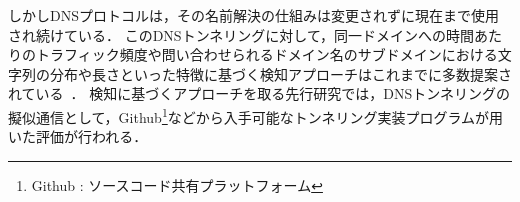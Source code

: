 しかしDNSプロトコルは，その名前解決の仕組みは変更されずに現在まで使用され続けている．
このDNSトンネリングに対して，同一ドメインへの時間あたりのトラフィック頻度や問い合わせられるドメイン名のサブドメインにおける文字列の分布や長さといった特徴に基づく検知アプローチはこれまでに多数提案されている~\cite{born, cheng, liu, asaf, steadman, jawad}．
検知に基づくアプローチを取る先行研究では，DNSトンネリングの擬似通信として，Github\footnote{Github : ソースコード共有プラットフォーム}などから入手可能なトンネリング実装プログラムが用いた評価が行われる．
